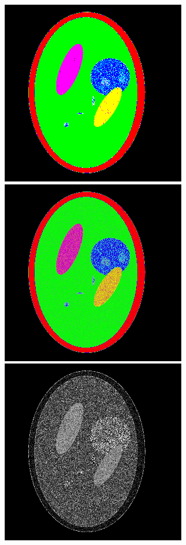 \documentclass[12pt,twoside,notitlepage]{report}
\begin{document}
        \clearpage
        \begin{figure}
            \begin{minipage}{0.49\textwidth}
                \includegraphics[scale=0.60]{example_mostlikely}
            \end{minipage}
            \hfill
            \begin{minipage}{0.49\textwidth}
                \includegraphics[scale=0.60]{example_probout}
            \end{minipage}
            \begin{minipage}{0.49\textwidth}
                \includegraphics[scale=0.60]{example_entropy}

\end{minipage}
\end{figure}
\end{document}

